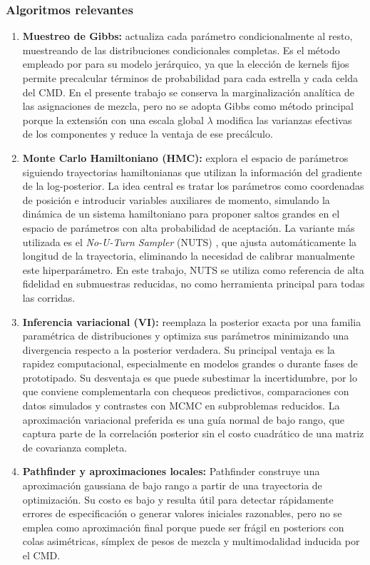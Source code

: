 \documentclass[stu, 12pt, letterpaper, donotrepeattitle, floatsintext, natbib]{apa7_ula}
\begin{document}
\subsubsection{Algoritmos relevantes}
\begin{enumerate}
    \item \textbf{Muestreo de Gibbs:} actualiza cada parámetro
    condicionalmente al resto, muestreando de las distribuciones
    condicionales completas. Es el método empleado por
    \citet{Leistedt_2017} para su modelo jerárquico, ya que la
    elección de kernels fijos permite precalcular términos de
    probabilidad para cada estrella y cada celda del CMD. En el
    presente trabajo se conserva la marginalización analítica de las
    asignaciones de mezcla, pero no se adopta Gibbs como método
    principal porque la extensión con una escala global $\lambda$
    modifica las varianzas efectivas de los componentes y reduce la
    ventaja de ese precálculo.
    \item \textbf{Monte Carlo Hamiltoniano (HMC):} explora el
    espacio de parámetros siguiendo trayectorias hamiltonianas que
    utilizan la información del gradiente de la log-posterior. La
    idea central es tratar los parámetros como coordenadas de
    posición e introducir variables auxiliares de momento, simulando
    la dinámica de un sistema hamiltoniano para proponer saltos
    grandes en el espacio de parámetros con alta probabilidad de
    aceptación. La variante más utilizada es el \textit{No-U-Turn
    Sampler} (NUTS) \citep{Hoffman_Gelman_2014}, que ajusta
    automáticamente la longitud de la trayectoria, eliminando la
    necesidad de calibrar manualmente este hiperparámetro. En este
    trabajo, NUTS se utiliza como referencia de alta fidelidad en
    submuestras reducidas, no como herramienta principal para todas las
    corridas.
    \item \textbf{Inferencia variacional (VI):} reemplaza la
    posterior exacta por una familia paramétrica de distribuciones y
    optimiza sus parámetros minimizando una divergencia respecto a la
    posterior verdadera. Su principal ventaja es la rapidez
    computacional, especialmente en modelos grandes o durante fases de
    prototipado. Su desventaja es que puede subestimar la
    incertidumbre, por lo que conviene complementarla con chequeos
    predictivos, comparaciones con datos simulados y contrastes con
    MCMC en subproblemas reducidos. La aproximación variacional
    preferida es una guía normal de bajo rango, que captura parte de la
    correlación posterior sin el costo cuadrático de una matriz de
    covarianza completa.
    \item \textbf{Pathfinder y aproximaciones locales:} Pathfinder
    construye una aproximación gaussiana de bajo rango a partir de una
    trayectoria de optimización. Su costo es bajo y resulta útil para
    detectar rápidamente errores de especificación o generar valores
    iniciales razonables, pero no se emplea como aproximación final
    porque puede ser frágil en posteriors con colas asimétricas,
    símplex de pesos de mezcla y multimodalidad inducida por el CMD.
\end{enumerate}
\end{document}
